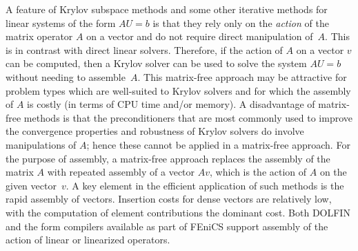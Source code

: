 A feature of Krylov subspace methods and some other iterative methods
for linear systems of the form $AU = b$ is that they rely only on
the \emph{action} of the matrix operator $A$ on a vector and do not
require direct manipulation of~$A$. This is in contrast with direct
linear solvers. Therefore, if the action of $A$ on a vector $v$ can be
computed, then a Krylov solver can be used to solve the system $AU =
b$ without needing to assemble~$A$. This matrix-free approach may be
attractive for problem types which are well-suited to Krylov solvers
and for which the assembly of $A$ is costly (in terms of CPU time
and/or memory).  A disadvantage of matrix-free methods is that the
preconditioners that are most commonly used to improve the convergence
properties and robustness of Krylov solvers do involve manipulations
of $A$; hence these cannot be applied in a matrix-free approach. For
the purpose of assembly, a matrix-free approach replaces the assembly
of the matrix $A$ with repeated assembly of a vector $Av$, which is
the action of $A$ on the given vector~$v$. A key element in the
efficient application of such methods is the rapid assembly of
vectors. Insertion costs for dense vectors are relatively low, with
the computation of element contributions the dominant cost. Both
DOLFIN and the form compilers available as part of FEniCS support
assembly of the action of linear or linearized operators.
